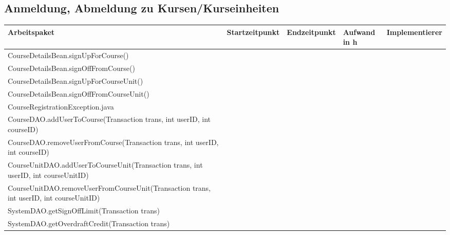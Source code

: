 \begin{landscape}
	\subsection{Anmeldung, Abmeldung zu Kursen/Kurseinheiten}
	\begin{tabular}{|p{10cm}|p{4cm}|p{3cm}|p{3cm}|p{3cm}|}
		\hline  \textbf{Arbeitspaket} & \textbf{Startzeitpunkt} & \textbf{Endzeitpunkt} & \textbf{Aufwand in h} & \textbf{Implementierer} \\ 
		\hline   CourseDetailsBean.signUpForCourse()                          &                            &                             &                     &\\
		\hline   CourseDetailsBean.signOffFromCourse()                        &                            &                             &                     &\\
		\hline   CourseDetailsBean.signUpForCourseUnit()                      &                            &                             &                     &\\
		\hline   CourseDetailsBean.signOffFromCourseUnit()                    &                            &                             &                     &\\
		\hline   CourseRegistrationException.java                             &                            &                             &                     &\\
		\hline   CourseDAO.addUserToCourse(Transaction trans, int userID, int courseID)            &                        &                         &                     &\\
		\hline   CourseDAO.removeUserFromCourse(Transaction trans, int userID, int courseID)       &                        &                         &                     &\\
		\hline   CourseUnitDAO.addUserToCourseUnit(Transaction trans, int userID, int courseUnitID)&                        &                         &                     &\\ 
		\hline   CourseUnitDAO.removeUserFromCourseUnit(Transaction trans, int userID, int courseUnitID) &                            &                             &                     &\\
		\hline   SystemDAO.getSignOffLimit(Transaction trans)                 &                            &                             &                     &\\ 
		\hline   SystemDAO.getOverdraftCredit(Transaction trans)              &                            &                             &                     &\\ 
		\hline 
	\end{tabular} \ \\
	\ \\
	

\end{landscape}
